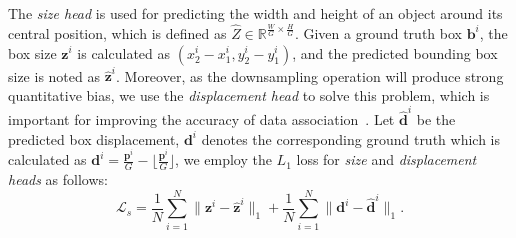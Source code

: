 \documentclass[acmsmall]{acmart}
\begin{document}
The \emph{size head} is used for predicting the width and height of an object around its central position, 
{which} is defined as $\hat{Z} \in \mathbb{R}^{\frac{W}{G} \times \frac{H}{G} }$. 
{Given} a ground truth box $\boldsymbol{b}^i$, the box size $\boldsymbol{z}^i$ is calculated as $(x_2^i-x_1^i, y_2^i-y_1^i)$, 
and the predicted bounding box size is noted as ${\hat{\boldsymbol{z}}}^i$. 
{
Moreover, as the downsampling operation will produce strong quantitative bias, we use the \emph{displacement head} to solve this problem, which is important for improving the accuracy of data association~\cite{fairmot}. 
} 
{Let} ${\hat{\boldsymbol{d}}}^i$ be the predicted box displacement, $\boldsymbol{d}^i$ denotes the corresponding ground truth which is calculated as $\boldsymbol{d}^i = \frac{\boldsymbol{p}^i}{G} - \lfloor \frac{\boldsymbol{p}^i}{G} \rfloor $, we employ the $L_1$ loss for \emph{size} and \emph{displacement heads} as follows:
\begin{equation}
\mathcal{L}_{s} = \frac{1}{N} \sum_{i=1}^{N} \|\boldsymbol{z}^i - \hat{\boldsymbol{z}}^i\|_1 + 
\frac{1}{N} \sum_{i=1}^{N} \|\boldsymbol{d}^i - \hat{\boldsymbol{d}}^i\|_1.
\end{equation}

\end{document}
